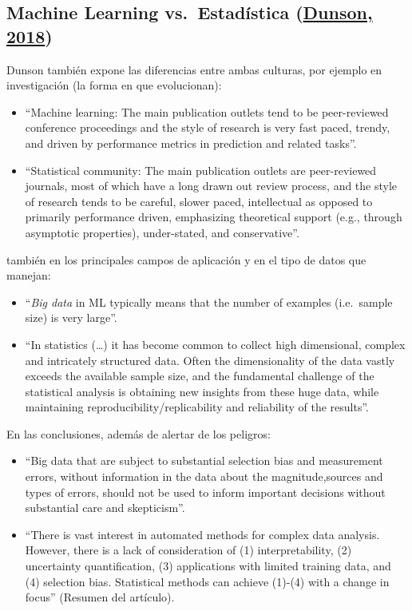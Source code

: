 \documentclass[
  spanish,
]{book}
\theoremstyle{break}
\theoremstyle{definition}
\theoremstyle{definition}
\theoremstyle{definition}
\theoremstyle{definition}
\theoremstyle{remark}
\begin{document}
\hypertarget{machine-learning-vs.-estaduxedstica-dunson2018statistics}{%
\subsection{\texorpdfstring{Machine Learning vs.~Estadística (\protect\hyperlink{ref-dunson2018statistics}{Dunson, 2018})}{Machine Learning vs.~Estadística (Dunson, 2018)}}\label{machine-learning-vs.-estaduxedstica-dunson2018statistics}}

Dunson también expone las diferencias entre ambas culturas, por ejemplo en investigación (la forma en que evolucionan):

\begin{itemize}
\item
  ``Machine learning: The main publication outlets tend to be peer-reviewed conference proceedings and the style of research is very fast paced, trendy, and driven by performance metrics in prediction and related tasks''.
\item
  ``Statistical community: The main publication outlets are peer-reviewed journals, most of which have a long drawn out review process, and the style of research tends to be careful, slower paced, intellectual as opposed to primarily performance driven, emphasizing theoretical support (e.g., through asymptotic properties), under-stated, and conservative''.
\end{itemize}

también en los principales campos de aplicación y en el tipo de datos que manejan:

\begin{itemize}
\item
  ``\emph{Big data} in ML typically means that the number of examples (i.e.~sample size) is very large''.
\item
  ``In statistics (\ldots) it has become common to collect high dimensional, complex and intricately structured data. Often the dimensionality of the data vastly exceeds the available sample size, and the fundamental challenge of the statistical analysis is obtaining new insights from these huge data, while maintaining reproducibility/replicability and reliability of the results''.
\end{itemize}

En las conclusiones, además de alertar de los peligros:

\begin{itemize}
\item
  ``Big data that are subject to substantial selection bias and measurement errors, without information in the data about the magnitude,sources and types of errors, should not be used to inform important decisions without substantial care and skepticism''.
\item
  ``There is vast interest in automated methods for complex data analysis. However, there is a lack of consideration of (1) interpretability, (2) uncertainty quantification, (3) applications with limited training data, and (4) selection bias. Statistical methods can achieve (1)-(4) with a change in focus'' (Resumen del artículo).
\end{itemize}
\end{document}
